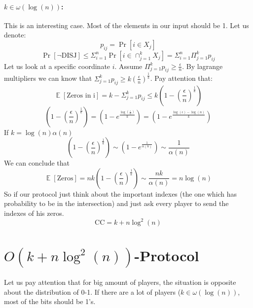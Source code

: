 \documentclass{article}
\theoremstyle{plain}
\begin{document}
\paragraph{$k \in \omega(\log(n))$:}
This is an interesting case. Most of the elements in our input should be 1. 
Let us denote:
\begin{equation*}
    p_{ij} = \Pr[i \in X_j]
\end{equation*}
\begin{equation*}
    \Pr[\neg \text{DISJ}] \leq \Sigma_{i=1}^{n}\Pr[i \in \cap_{j=1}^{k}X_j] = \Sigma_{i=1}^{n}\Pi_{j=1}^{k}p_{ij}
\end{equation*}
Let us look at a specific coordinate $i$. Assume $\Pi_{j=1}^{k}p_{ij} \geq \frac{\epsilon}{n}$.
By lagrange multipliers we can know that $\Sigma_{j=1}^{k}p_{ij} \geq k(\frac{\epsilon}{n})^{\frac{1}{k}}$.
Pay attention that:
\begin{equation*}
    \mathop{\mathbb{E}}[\text{Zeros in i}] = k - \Sigma_{j=1}^{k}p_{ij} \leq k \left(1 - \left(\frac{\epsilon}{n}\right)^{\frac{1}{k}}\right)
\end{equation*}
\begin{equation*}
    \left(1 - \left(\frac{\epsilon}{n}\right)^{\frac{1}{k}}\right) = \left(1 - e^{\frac{\log(\frac{\epsilon}{n})}{k}}\right) = \left(1 - e^{\frac{\log(\epsilon) -\log(n)}{k}}\right)
\end{equation*}
If $k = \log(n) \alpha(n)$
\begin{equation*}
    \left(1 - \left(\frac{\epsilon}{n}\right)^{\frac{1}{k}}\right) \sim \left(1 - e^{\frac{1}{\alpha(n)}}\right) \sim \frac{1}{\alpha(n)}
\end{equation*}
We can conclude that
\begin{equation*}
    \mathop{\mathbb{E}}[\text{Zeros}] = nk\left(1 - \left(\frac{\epsilon}{n}\right)^{\frac{1}{k}}\right) \sim \frac{nk}{\alpha(n)} = n\log(n)
\end{equation*}
So if our protocol just think about the important indexes (the one which has probability to be in the intersection) and just ask every player to send the indexes of his zeros.
\begin{equation*}
    \text{CC} = k + n\log^2(n)
\end{equation*}
\section{$O(k + n\log^2(n))$-Protocol}
Let us pay attention that for big amount of players, the situation is opposite about the distribution of 0-1. If there are a lot of players ($k \in \omega(\log(n))$, most of the bits should be 1's.
\end{document}
